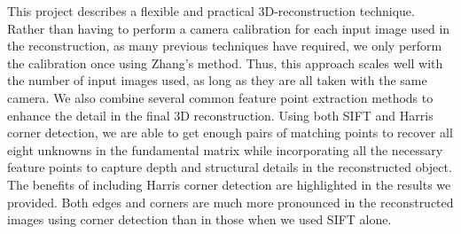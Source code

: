\label{s:conclusion}
This project describes a flexible and practical 3D-reconstruction technique. Rather than having to perform a camera calibration for each input image used in the reconstruction, as many previous techniques have required, we only perform the calibration once using Zhang’s method. Thus, this approach scales well with the number of input images used, as long as they are all taken with the same camera. We also combine several common feature point extraction methods to enhance the detail in the final 3D reconstruction. Using both SIFT and Harris corner detection, we are able to get enough pairs of matching points to recover all eight unknowns in the fundamental matrix while incorporating all the necessary feature points to capture depth and structural details in the reconstructed object. The benefits of including Harris corner detection are highlighted in the results we provided. Both edges and corners are much more pronounced in the reconstructed images using corner detection than in those when we used SIFT alone. 

